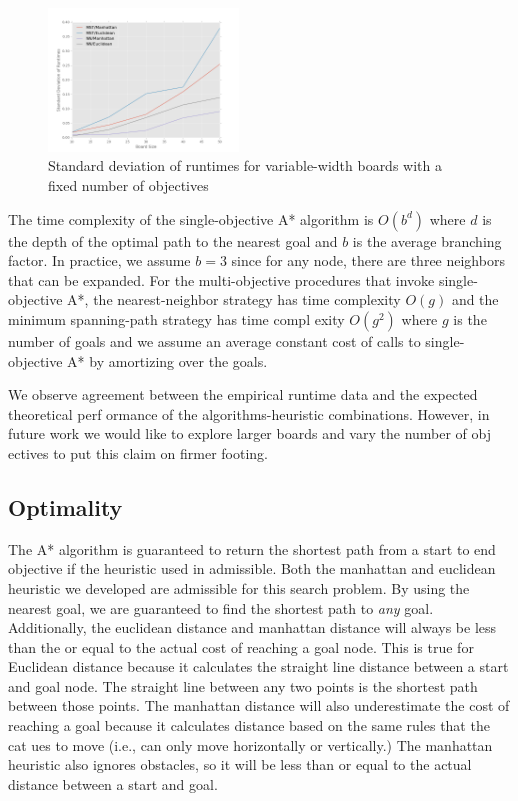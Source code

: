 \documentclass[12pt, conference, compsocconf]{IEEEtran}
\begin{document}
\begin{figure}[h!]
    \centering
    \includegraphics[width=0.45\textwidth]{variability.png}
    \caption{Standard deviation of runtimes for variable-width boards with a fixed number of objectives}
    \label{variability-fig}
\end{figure}

The time complexity of the single-objective A* algorithm is $O(b^d)$ where $d$
is the depth of the optimal path to the nearest goal and $b$ is the average
branching factor.  In practice, we assume $b = 3$ since for any node, there are
three neighbors that can be expanded.  For the multi-objective procedures that
invoke single-objective A*, the nearest-neighbor strategy has time complexity
$O(g)$ and the minimum spanning-path strategy has time compl exity $O(g^2)$
where $g$ is the number of goals and we assume an average constant cost of
calls to single-objective A* by amortizing over the goals.

We observe agreement between the empirical runtime data and the expected
theoretical perf ormance of the algorithms-heuristic combinations.  However, in
future work we would like to explore larger boards and vary the number of obj
ectives to put this claim on firmer footing.


\subsection{Optimality}
The A* algorithm is guaranteed to return the shortest path from a start to end
objective if the heuristic used in admissible.  Both the manhattan and
euclidean heuristic we developed are admissible for this search problem.  By
using the nearest goal, we are guaranteed to find the shortest path to {\em
any} goal.  Additionally, the euclidean distance and manhattan distance will
always be less than the or equal to the actual cost of reaching a goal node.
This is true for Euclidean distance because it calculates the straight line
distance between a start and goal node.  The straight line between any two
points is the shortest path between those points.  The manhattan distance will
also underestimate the cost of reaching a goal because it calculates distance
based on the same rules that the cat ues to move (i.e., can only move
horizontally or vertically.)  The manhattan heuristic also ignores obstacles,
so it will be less than or equal to the actual distance between a start and
goal.
\end{document}
